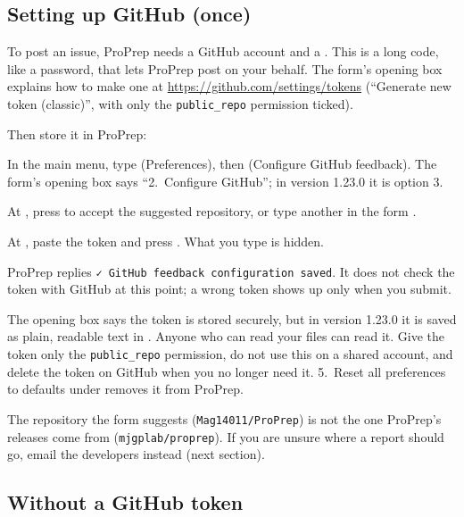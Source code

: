 \subsection*{Setting up GitHub (once)}

To post an issue, ProPrep needs a GitHub account and a . This is a long code, like a password, that lets ProPrep post on your
behalf. The
form's opening box explains how to make one at
\url{https://github.com/settings/tokens} (``Generate new token (classic)'', with
only the \texttt{public\_repo} permission ticked).

Then store it in ProPrep:
\begin{steps}
  \item In the main menu, type  (Preferences), then 
  (\textsf{Configure GitHub feedback}). The form's opening box says
  ``2.~Configure GitHub''; in version 1.23.0 it is option 3.
  \item At , press  to accept
  the suggested repository, or type another in the form .
  \item At , paste the token and press . What you type
  is hidden.
\end{steps}

ProPrep replies \texttt{✓ GitHub feedback configuration saved}. It does not
check the token with GitHub at this point; a wrong token shows up only when you
submit.

\begin{watchout}
The opening box says the token is stored securely, but in version 1.23.0 it is
saved as plain, readable text in . Anyone who can
read your files can read it. Give the token only the \texttt{public\_repo}
permission, do not use this on a shared account, and delete the token on GitHub
when you no longer need it. \textsf{5.~Reset all preferences to defaults} under
 removes it from ProPrep.
\end{watchout}

\begin{behindscenes}
The repository the form suggests (\texttt{Mag14011/ProPrep}) is not the one
ProPrep's releases come from (\texttt{mjgplab/proprep}). If you are unsure where
a report should go, email the developers instead (next section).
\end{behindscenes}

\subsection*{Without a GitHub token}

